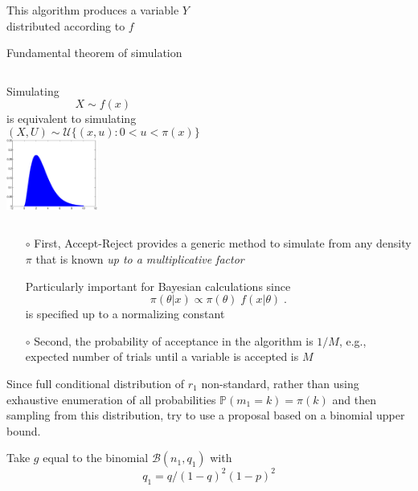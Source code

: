 \begin{slide}
\end{slide}\begin{slide}

This algorithm produces a variable $Y$\\ distributed according to $f$

\begin{block}{Fundamental theorem of simulation}
\begin{columns}
Simulating
$$
X \sim f(x)
$$
is equivalent to simulating
$$
(X,U) \sim {\mathcal U} \{(x,u):0<u<\pi(x)\}
$$
\includegraphics[width=3cm]{figures/uniform.eps}
\end{columns}
\end{block}

\end{slide}\begin{slide}

\begin{enumerate}
\item[$\circ$] First, Accept-Reject provides a generic method 
to simulate from any density $\pi$ that is known {\it up to a multiplicative factor}

Particularly important for Bayesian calculations since
$$
  \pi(\theta|x) \propto \pi(\theta) \; f(x|\theta) \;. 
$$
is specified up to a normalizing constant
\pause
\item[$\circ$] Second, the probability of acceptance in the algorithm is $1/M$, e.g.,
expected number of trials until a variable is accepted is $M$
\end{enumerate}

\end{slide}\begin{slide}

Since full conditional distribution of $r_1$ non-standard,
rather than using exhaustive enumeration of all
probabilities $\mathbb{P}(m_1=k)=\pi(k)$ and then sampling from this distribution,
try to use a proposal based on a binomial upper bound. 

\vs\pause
Take $g$ equal to the binomial $\mathscr{B}(n_1,q_1)$ with 
$$
q_1=q/(1-q)^2(1-p)^2
$$


\end{slide}
